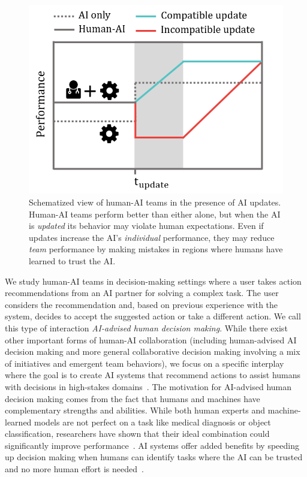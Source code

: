 \documentclass[letterpaper]{article}
\begin{document}
\begin{figure}[t]
    \begin{center}
    \includegraphics[width=\linewidth]{Picture1v2.png}
    \end{center}
    \caption{Schematized view of human-AI teams in the presence of AI updates. Human-AI teams perform better than either alone, but when the AI is {\em updated} its behavior may violate human expectations. Even if updates increase the AI's {\em individual} performance, they may reduce {\em team} performance by making mistakes in regions where humans have learned to trust the AI.}
    \label{fig:landing}
\end{figure}

We study human-AI teams in decision-making settings where a user takes action recommendations from an AI partner for solving a complex task. The user considers the recommendation and, based on previous experience with the system, decides to accept the suggested action or take a different action. We call this type of interaction {\em AI-advised human decision making}. While there exist other important forms of human-AI collaboration (including human-advised AI decision making and more general collaborative decision making involving a mix of initiatives and emergent team behaviors), we focus on a specific interplay where the goal is to create AI systems that recommend actions to assist humans with decisions in high-stakes domains~\cite{angwin2016machine,bayati2014data}. The motivation for AI-advised human decision making comes from the fact that humans and machines have complementary strengths and abilities. While both human experts and machine-learned models are not perfect on a task like medical diagnosis or object classification, researchers have shown that their ideal combination could significantly improve performance~\cite{wang2016deep,kamar2012combining}. 
AI systems offer added benefits by speeding up decision making when humans can identify tasks where the AI can be trusted and no more human effort is needed~\cite{lasecki2012scribe,lasecki2012real}. 
\end{document}
